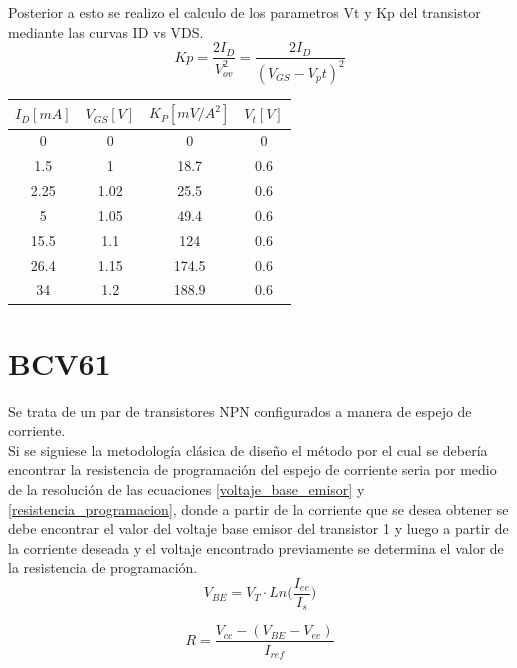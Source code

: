 Posterior a esto se realizo el calculo de los parametros Vt y Kp del transistor mediante las curvas ID vs VDS.\\

\begin{equation}
Kp = \frac{2 I_D}{V_{ov}^2} = \frac{2 I_D}{(V_{GS} - V_pt)^2} 
\end{equation}

\begin{table}[H]
\centering
\begin{tabular}{|c|c|c|c|}
\hline 
$I_D [mA]$ & $V_{GS} [V]$ & $K_P [mV/A^2]$ & $V_t [V]$  \\
 \hline
0& 0 & 0 & 0\\
\hline
1.5& 1 & 18.7 & 0.6\\ 
\hline
2.25& 1.02 & 25.5 & 0.6 \\ 
\hline
5 & 1.05 & 49.4 & 0.6 \\ 
\hline
15.5& 1.1 & 124 & 0.6 \\ 
\hline
26.4& 1.15 & 174.5 & 0.6\\ 
\hline
34& 1.2 & 188.9 & 0.6 \\ 
\hline
\end{tabular} 
\end{table}

\section{BCV61}
Se trata de un par de transistores NPN configurados a manera de espejo de corriente.\\

Si se siguiese la metodología clásica de diseño el método por el cual se debería encontrar la resistencia de programación del espejo de corriente seria por medio de la resolución de las ecuaciones \ref{voltaje_base_emisor} y \ref{resistencia_programacion}, donde a partir de la corriente que se desea obtener se debe encontrar el valor del voltaje base emisor del transistor 1 y luego a partir de la corriente deseada y el voltaje encontrado previamente se determina el valor de la resistencia de programación.\\

\begin{equation}\label{voltaje_base_emisor}
V_{BE}=V_T\cdot Ln\bigg(\frac{I_{ee}}{I_{s}}\bigg)
\end{equation}

\begin{equation}\label{resistencia_programacion}
R=\frac{V_{cc}-(V_{BE}-V_{ee})}{I_{ref}}
\end{equation}

